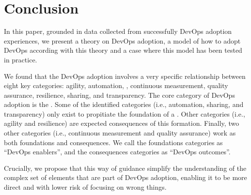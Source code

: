 \section{Conclusion} \label{sec:conclusion}

In this paper, grounded in data collected from successfully DevOps adoption
experiences, we present a theory on DevOps adoption, a model of how to adopt
DevOps according with this theory and a case where this model has been tested
in practice.

We found that the DevOps adoption involves a very specific relationship between
eight key categories: agility, automation, \cc, continuous
measurement, quality assurance, resilience, sharing, and transparency. The core
category of DevOps adoption is the \cc. Some of the
identified categories (i.e., automation, sharing, and transparency) only exist
to propitiate the foundation of a \cc. Other categories
(i.e., agility and resilience) are expected consequences of this formation.
Finally, two other categories (i.e., continuous measurement and quality
assurance) work as both foundations and consequences. We call the foundations
categories as ``DevOps enablers'', and the consequences categories as ``DevOps outcomes''.

Crucially, we propose that this way of guidance simplify the understanding of the
complex set of elements that are part of DevOps adoption, enabling it to be
more direct and with lower risk of focusing on wrong things.
